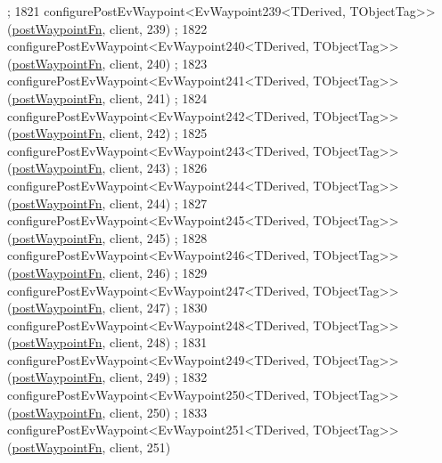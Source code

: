 \begin{DoxyCode}
      ;
1821     configurePostEvWaypoint<EvWaypoint239<TDerived, TObjectTag>>(\hyperlink{classmove__base__z__client_1_1WaypointEventDispatcher_acc538eb7506c13f7cca2268a1742dadd}{postWaypointFn}, client, 239)
      ;
1822     configurePostEvWaypoint<EvWaypoint240<TDerived, TObjectTag>>(\hyperlink{classmove__base__z__client_1_1WaypointEventDispatcher_acc538eb7506c13f7cca2268a1742dadd}{postWaypointFn}, client, 240)
      ;
1823     configurePostEvWaypoint<EvWaypoint241<TDerived, TObjectTag>>(\hyperlink{classmove__base__z__client_1_1WaypointEventDispatcher_acc538eb7506c13f7cca2268a1742dadd}{postWaypointFn}, client, 241)
      ;
1824     configurePostEvWaypoint<EvWaypoint242<TDerived, TObjectTag>>(\hyperlink{classmove__base__z__client_1_1WaypointEventDispatcher_acc538eb7506c13f7cca2268a1742dadd}{postWaypointFn}, client, 242)
      ;
1825     configurePostEvWaypoint<EvWaypoint243<TDerived, TObjectTag>>(\hyperlink{classmove__base__z__client_1_1WaypointEventDispatcher_acc538eb7506c13f7cca2268a1742dadd}{postWaypointFn}, client, 243)
      ;
1826     configurePostEvWaypoint<EvWaypoint244<TDerived, TObjectTag>>(\hyperlink{classmove__base__z__client_1_1WaypointEventDispatcher_acc538eb7506c13f7cca2268a1742dadd}{postWaypointFn}, client, 244)
      ;
1827     configurePostEvWaypoint<EvWaypoint245<TDerived, TObjectTag>>(\hyperlink{classmove__base__z__client_1_1WaypointEventDispatcher_acc538eb7506c13f7cca2268a1742dadd}{postWaypointFn}, client, 245)
      ;
1828     configurePostEvWaypoint<EvWaypoint246<TDerived, TObjectTag>>(\hyperlink{classmove__base__z__client_1_1WaypointEventDispatcher_acc538eb7506c13f7cca2268a1742dadd}{postWaypointFn}, client, 246)
      ;
1829     configurePostEvWaypoint<EvWaypoint247<TDerived, TObjectTag>>(\hyperlink{classmove__base__z__client_1_1WaypointEventDispatcher_acc538eb7506c13f7cca2268a1742dadd}{postWaypointFn}, client, 247)
      ;
1830     configurePostEvWaypoint<EvWaypoint248<TDerived, TObjectTag>>(\hyperlink{classmove__base__z__client_1_1WaypointEventDispatcher_acc538eb7506c13f7cca2268a1742dadd}{postWaypointFn}, client, 248)
      ;
1831     configurePostEvWaypoint<EvWaypoint249<TDerived, TObjectTag>>(\hyperlink{classmove__base__z__client_1_1WaypointEventDispatcher_acc538eb7506c13f7cca2268a1742dadd}{postWaypointFn}, client, 249)
      ;
1832     configurePostEvWaypoint<EvWaypoint250<TDerived, TObjectTag>>(\hyperlink{classmove__base__z__client_1_1WaypointEventDispatcher_acc538eb7506c13f7cca2268a1742dadd}{postWaypointFn}, client, 250)
      ;
1833     configurePostEvWaypoint<EvWaypoint251<TDerived, TObjectTag>>(\hyperlink{classmove__base__z__client_1_1WaypointEventDispatcher_acc538eb7506c13f7cca2268a1742dadd}{postWaypointFn}, client, 251)

\end{DoxyCode}
